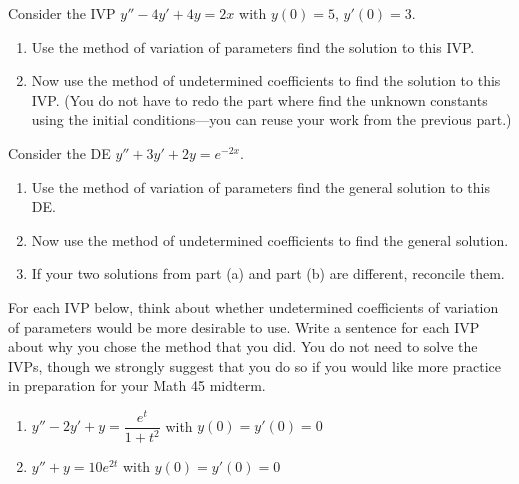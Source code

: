 \documentclass[12pt,letterpaper]{hmcpset}
\begin{document}
\begin{solution}
    \vfill
\end{solution}
\newpage

\begin{problem}[3]
    Consider the IVP $y''-4y'+4y=2x$ with $y(0) = 5$, $y'(0) = 3$.
    \begin{enumerate}
        \item Use the method of variation of parameters find the solution to this IVP.
        \item Now use the method of undetermined coefficients to find the solution to this IVP. (You do not have to redo the part where find the unknown constants using the initial conditions---you can reuse your work from the previous part.)
    \end{enumerate}
\end{problem}

\begin{solution}
    \vfill
\end{solution}
\newpage

\begin{problem}[4]
    Consider the DE $y'' + 3y' + 2y = e^{-2x}$.
    \begin{enumerate}
        \item Use the method of variation of parameters find the general solution to this DE.
        \item Now use the method of undetermined coefficients to find the general solution.
        \item If your two solutions from part (a) and part (b) are different, reconcile them.
    \end{enumerate}
\end{problem}

\begin{solution}
    \vfill
\end{solution}
\newpage

\begin{problem}[5]
    For each IVP below, think about whether undetermined
    coefficients of variation of parameters would be more desirable to use. Write a 
    sentence for each IVP about why you chose the method that you did. You do not need to solve the IVPs, though we strongly suggest that you do so if you would like more practice in preparation for your Math 45 midterm.
    \begin{enumerate}
        \item $y''-2y'+y=\dfrac{e^{t}}{1+t^2}$ with $y(0)=y'(0)=0$
        \item $y''+y=10e^{2t}$ with $y(0)=y'(0)=0$
    \end{enumerate}
\end{problem}

\begin{solution}
    \vfill
\end{solution}
\end{document}

